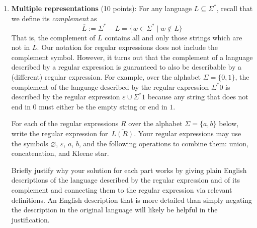 \begin{enumerate}[wide, labelwidth=!, labelindent=0pt]
\begin{enumerate}
    {\it Hints}: (1) Consider having a state for each possible remainder upon division by $m$.
     (2) To determine transitions, notice that reading a new character will shift what we already read over by
     one slot.

    \item\gradeCorrect Choose a positive integer $m_{0}$ between $4$ and $8$ (inclusive) and draw the state diagram
    of a DFA recognizing the language over $\{0,1,2\}$ $$\{ w \in \{0,1,2\}^* \mid w \text{ is a base $3$ expansion of a positive 
    integer that is a multiple of $m_0$}\}$$
    A complete solution will include the state diagram of your DFA and 
    a brief justification 
    of your construction by explaining the role each state plays in the machine, as well as a brief 
    justification about how the strings accepted and rejected by the machine connect to the specified language.
    \end{enumerate}

    {\it Bonus extension to think about (ungraded):} Which other languages related to sets of integers 
    can be proved to be regular using a similar strategy? 


\item\textbf{Multiple representations} (10 points):
For any language $L \subseteq \Sigma^*$, recall that we define its \emph{complement} as 
$$\overline{L} := \Sigma^* - L = \{w \in \Sigma^* \mid w \notin L\}$$ That is, the complement of $L$ 
contains all and only those strings which are not in $L$. Our notation for regular expressions does not 
include the complement symbol. However, 
it turns out that the complement of a language described by a regular expression is guaranteed to also be describable by a 
(different) regular expression. For example, over the alphabet $\Sigma = \{0,1\}$, the complement of the language described 
by the regular expression $\Sigma^* 0$ is described by the regular expression $\varepsilon \cup \Sigma^*1$
because any string that does not end in $0$
must either be the empty string or end in $1$.

For each of the regular expressions $R$ over the alphabet $\Sigma = \{a,b\}$ below, write the regular 
expression for~$\overline{L(R)}$. Your regular expressions may use the symbols
$\varnothing$, $\varepsilon$, $a$, $b$, and the 
following operations to combine them: union, concatenation, 
and Kleene star.

Briefly justify why your solution for each part works by giving plain English descriptions of the language 
described by the regular expression and of its complement and connecting them to the regular 
expression via relevant definitions. An English description that is more 
detailed than simply negating the description in the original language will likely be helpful in the justification.


\end{enumerate}
